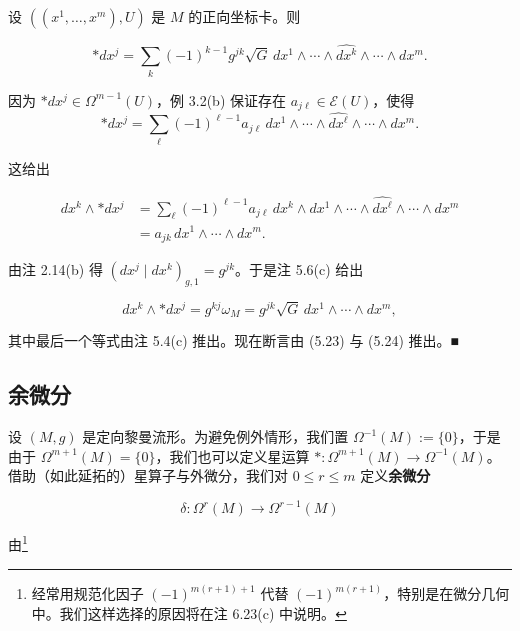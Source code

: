 \begin{proposition}

设 $ ((x^{1},\ldots,x^{m}),U) $ 是 $ M $ 的正向坐标卡。则

\[
\ast dx^{j} = \sum_{k}(-1)^{k-1}g^{jk}\sqrt{G}\,dx^{1} \wedge \cdots \wedge \widehat{dx^{k}} \wedge \cdots \wedge dx^{m} .
\]

\proofhead
因为 $ \ast dx^{j} \in \Omega^{m-1}(U) $，例 3.2(b) 保证存在 $ a_{j\ell} \in \mathcal{E}(U) $，使得
\[
\ast dx^{j} = \sum_{\ell}(-1)^{\ell-1}a_{j\ell}\,dx^{1} \wedge \cdots \wedge \widehat{dx^{\ell}} \wedge \cdots \wedge dx^{m} .
\]

这给出

\begin{equation}
\begin{aligned}
dx^{k} \wedge \ast dx^{j} &= \sum_{\ell}(-1)^{\ell-1}a_{j\ell}\,dx^{k} \wedge dx^{1} \wedge \cdots \wedge \widehat{dx^{\ell}} \wedge \cdots \wedge dx^{m} \\ &= a_{jk}\,dx^{1} \wedge \cdots \wedge dx^{m} .
\end{aligned}\tag{5.23}
\end{equation}

由注 2.14(b) 得 $ (dx^{j} \mid dx^{k})_{g,1} = g^{jk} $。于是注 5.6(c) 给出

\begin{equation}
dx^{k} \wedge \ast dx^{j} = g^{kj}\omega_{M} = g^{jk}\sqrt{G}\,dx^{1} \wedge \cdots \wedge dx^{m} ,\tag{5.24}
\end{equation}

其中最后一个等式由注 5.4(c) 推出。现在断言由 (5.23) 与 (5.24) 推出。\nobreak\hspace{0.35em}■

\end{proposition}

\subsection*{余微分}

设 $ (M,g) $ 是定向黎曼流形。为避免例外情形，我们置 $ \Omega^{-1}(M) := \{0\} $，于是由于 $ \Omega^{m+1}(M) = \{0\} $，我们也可以定义星运算 $ \ast: \Omega^{m+1}(M) \to \Omega^{-1}(M) $。借助（如此延拓的）星算子与外微分，我们对 $ 0 \le r \le m $ 定义\textbf{余微分}

\[
\delta: \Omega^{r}(M) \to \Omega^{r-1}(M)
\]

由\footnote{经常用规范化因子 $ (-1)^{m(r+1)+1} $ 代替 $ (-1)^{m(r+1)} $，特别是在微分几何中。我们这样选择的原因将在注 6.23(c) 中说明。}

